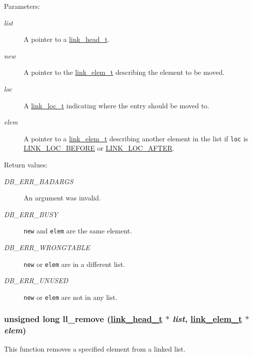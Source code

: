 \begin{Desc}
\item[Parameters:]
\begin{description}
\item[{\em list}]A pointer to a \hyperlink{group__dbprim__link_a0}{link\_\-head\_\-t}. \item[{\em new}]A pointer to the \hyperlink{group__dbprim__link_a1}{link\_\-elem\_\-t} describing the element to be moved. \item[{\em loc}]A \hyperlink{group__dbprim__link_a4}{link\_\-loc\_\-t} indicating where the entry should be moved to. \item[{\em elem}]A pointer to a \hyperlink{group__dbprim__link_a1}{link\_\-elem\_\-t} describing another element in the list if {\tt loc} is \hyperlink{group__dbprim__link_a26a133}{LINK\_\-LOC\_\-BEFORE} or \hyperlink{group__dbprim__link_a26a134}{LINK\_\-LOC\_\-AFTER}.\end{description}
\end{Desc}
\begin{Desc}
\item[Return values:]
\begin{description}
\item[{\em DB\_\-ERR\_\-BADARGS}]An argument was invalid. \item[{\em DB\_\-ERR\_\-BUSY}]{\tt new} and {\tt elem} are the same element. \item[{\em DB\_\-ERR\_\-WRONGTABLE}]{\tt new} or {\tt elem} are in a different list. \item[{\em DB\_\-ERR\_\-UNUSED}]{\tt new} or {\tt elem} are not in any list. \end{description}
\end{Desc}
\hypertarget{group__dbprim__link_a8}{
\subsubsection[ll\_\-remove]{\setlength{\rightskip}{0pt plus 5cm}unsigned long ll\_\-remove (\hyperlink{dbprim_8h_a0}{link\_\-head\_\-t} $\ast$ {\em list}, \hyperlink{dbprim_8h_a1}{link\_\-elem\_\-t} $\ast$ {\em elem})}}
\label{group__dbprim__link_a8}


This function removes a specified element from a linked list.

